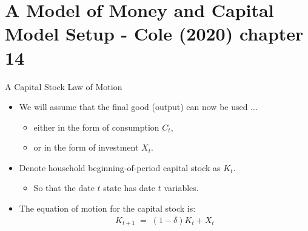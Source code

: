 \documentclass[10pt,c,aspectratio=1610,handout]{beamer}
\begin{document}
\section{A Model of Money and Capital\\{\small Model Setup - Cole (2020) chapter 14}}%
\begin{frame}{A Capital Stock Law of Motion}%
  \begin{itemize}%
    \item[$\blacktriangleright$] We will assume that the final good (output) can now be used ...%
    \begin{itemize}%
      \item[$\rightarrow$] either in the form of consumption $C_{t}$,%
      \item[$\rightarrow$] or in the form of investment $X_{t}$.%
    \end{itemize}%
    \vspace*{0.2in}%
    \pause%
    \item[$\blacktriangleright$] Denote household beginning-of-period capital stock as $K_{t}$.%
    \begin{itemize}%
      \item[$\rightarrow$] So that the date $t$ state has date $t$ variables.%
    \end{itemize}%
    \vspace*{0.2in}%
    \pause%
    \item[$\blacktriangleright$] The equation of motion for the capital stock is:%
    \begin{align*}%
      K_{t+1} \; = \; (1-\delta )K_{t}+X_{t}%
    \end{align*}%
  \end{itemize}%
\end{frame}%
\end{document}
